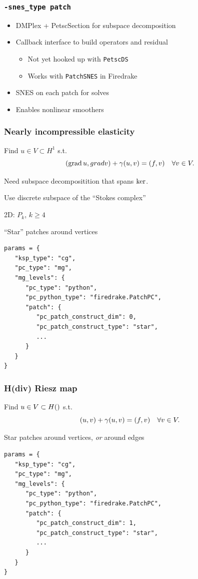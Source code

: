 \documentclass[presentation,aspectratio=43]{beamer}
\DeclareMathOperator{\grad}{grad}
\let\div\relax
\DeclareMathOperator{\div}{div}
\begin{document}
\begin{frame}
  \frametitle{\texttt{-snes\_type patch}}
  \begin{itemize}
  \item DMPlex + PetscSection for subspace decomposition
  \item Callback interface to build operators and residual
    \begin{itemize}
    \item Not yet hooked up with \texttt{PetscDS}
    \item Works with \texttt{PatchSNES} in Firedrake
    \end{itemize}
  \item SNES on each patch for solves
  \item Enables nonlinear smoothers
  \end{itemize}
\end{frame}

\begin{frame}[fragile]
  \frametitle{Nearly incompressible elasticity}
    Find $u \in V \subset H^1$ s.t.
    \begin{equation*}
      (\grad u, grad v) + \gamma (\div u, \div v) = (f, v) \quad \forall v \in V.
    \end{equation*}

    Need subspace decompositition that spans $\ker \div$.

    Use discrete subspace of the ``Stokes complex''

    2D: $P_k$, $k \ge 4$

    ``Star'' patches around vertices

\begin{verbatim}
params = {
   "ksp_type": "cg",
   "pc_type": "mg",
   "mg_levels": {
      "pc_type": "python",
      "pc_python_type": "firedrake.PatchPC",
      "patch": {
         "pc_patch_construct_dim": 0,
         "pc_patch_construct_type": "star",
         ...
      }
   }
}
\end{verbatim}
\end{frame}

\begin{frame}[fragile]
  \frametitle{H(div) Riesz map}
  Find $u \in V \subset H(\div)$ s.t.
  \begin{equation*}
    (u, v) + \gamma (\div u, \div v) = (f, v) \quad \forall v \in V.
  \end{equation*}

  Star patches around vertices, \emph{or} around edges
\begin{verbatim}
params = {
   "ksp_type": "cg",
   "pc_type": "mg",
   "mg_levels": {
      "pc_type": "python",
      "pc_python_type": "firedrake.PatchPC",
      "patch": {
         "pc_patch_construct_dim": 1,
         "pc_patch_construct_type": "star",
         ...
      }
   }
}
\end{verbatim}
\end{frame}
\end{document}
